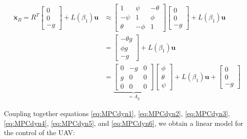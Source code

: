 \begin{align}
	\ddot{\mathbf{x}}_B = R^T
	\begin{bmatrix}
		0 \\
		0 \\
		-g
	\end{bmatrix}
	+L(\beta_1)\mathbf{u} &\approx
	\begin{bmatrix}
		1 & \psi  & -\theta \\
		-\psi & 1 & \phi \\
		\theta & -\phi & 1  
	\end{bmatrix}
	\begin{bmatrix}
		0 \\
		0 \\
		-g
	\end{bmatrix}	
	+L(\beta_1)\mathbf{u} \nonumber \\
	&=
	\begin{bmatrix}
		-\theta g \\
		\phi g \\
		-g 
	\end{bmatrix}
	+L(\beta_1)\mathbf{u} \nonumber \\
	&=\underbrace{ 
	\begin{bmatrix}
		0 & -g & 0 \\
		g & 0  & 0 \\
		0 & 0  & 0
	\end{bmatrix}}_{=A_g} 
	\begin{bmatrix}
		\phi \\
		\theta \\
		\psi
	\end{bmatrix} + L(\beta_1)\mathbf{u}+
	\begin{bmatrix}
		0 \\
		0 \\
		-g
	\end{bmatrix}
	\label{eq:MPCdyn6}	
\end{align}

\noindent Coupling together equations \eqref{eq:MPCdyn1}, \eqref{eq:MPCdyn2}, \eqref{eq:MPCdyn3}, \eqref{eq:MPCdyn4}, \eqref{eq:MPCdyn5}, and \eqref{eq:MPCdyn6}, we obtain a linear model for the control of the UAV:

